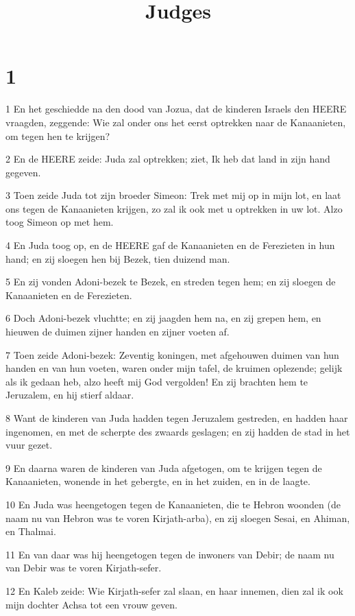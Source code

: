 

\title{Judges}



\chapter{1}

\par 1 En het geschiedde na den dood van Jozua, dat de kinderen Israels den HEERE vraagden, zeggende: Wie zal onder ons het eerst optrekken naar de Kanaanieten, om tegen hen te krijgen?
\par 2 En de HEERE zeide: Juda zal optrekken; ziet, Ik heb dat land in zijn hand gegeven.
\par 3 Toen zeide Juda tot zijn broeder Simeon: Trek met mij op in mijn lot, en laat ons tegen de Kanaanieten krijgen, zo zal ik ook met u optrekken in uw lot. Alzo toog Simeon op met hem.
\par 4 En Juda toog op, en de HEERE gaf de Kanaanieten en de Ferezieten in hun hand; en zij sloegen hen bij Bezek, tien duizend man.
\par 5 En zij vonden Adoni-bezek te Bezek, en streden tegen hem; en zij sloegen de Kanaanieten en de Ferezieten.
\par 6 Doch Adoni-bezek vluchtte; en zij jaagden hem na, en zij grepen hem, en hieuwen de duimen zijner handen en zijner voeten af.
\par 7 Toen zeide Adoni-bezek: Zeventig koningen, met afgehouwen duimen van hun handen en van hun voeten, waren onder mijn tafel, de kruimen oplezende; gelijk als ik gedaan heb, alzo heeft mij God vergolden! En zij brachten hem te Jeruzalem, en hij stierf aldaar.
\par 8 Want de kinderen van Juda hadden tegen Jeruzalem gestreden, en hadden haar ingenomen, en met de scherpte des zwaards geslagen; en zij hadden de stad in het vuur gezet.
\par 9 En daarna waren de kinderen van Juda afgetogen, om te krijgen tegen de Kanaanieten, wonende in het gebergte, en in het zuiden, en in de laagte.
\par 10 En Juda was heengetogen tegen de Kanaanieten, die te Hebron woonden (de naam nu van Hebron was te voren Kirjath-arba), en zij sloegen Sesai, en Ahiman, en Thalmai.
\par 11 En van daar was hij heengetogen tegen de inwoners van Debir; de naam nu van Debir was te voren Kirjath-sefer.
\par 12 En Kaleb zeide: Wie Kirjath-sefer zal slaan, en haar innemen, dien zal ik ook mijn dochter Achsa tot een vrouw geven.
